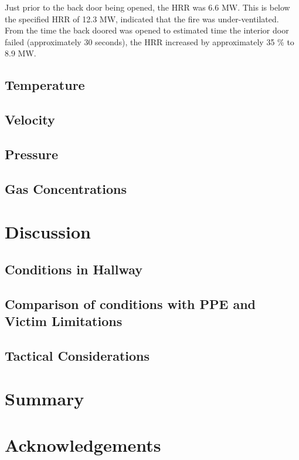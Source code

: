 \documentclass[11pt,oneside]{book}
\begin{document}
Just prior to the back door being opened, the HRR was 6.6 MW. This is below the specified HRR of 12.3 MW, indicated that the fire was under-ventilated. From the time the back doored was opened to estimated time the interior door failed (approximately 30 seconds), the HRR increased by approximately 35 \% to 8.9 MW.



\section{Temperature}

\section{Velocity}

\section{Pressure}

\section{Gas Concentrations}

\chapter{Discussion}

\section{Conditions in Hallway}

\section{Comparison of conditions with PPE and Victim Limitations}

\section{Tactical Considerations}

\chapter{Summary}

\chapter{Acknowledgements}
\end{document}
